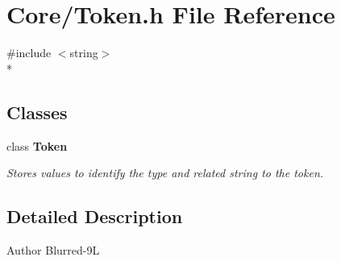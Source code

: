 \section{Core/\-Token.h File Reference}
\label{_token_8h}
{\ttfamily \#include $<$string$>$}\\*
\subsection*{Classes}
\begin{DoxyCompactItemize}
\item 
class {\bf Token}
\begin{DoxyCompactList}\small\item\em Stores values to identify the type and related string to the token. \end{DoxyCompactList}\end{DoxyCompactItemize}


\subsection{Detailed Description}
\begin{DoxyAuthor}{Author}
Blurred-\/9\-L 
\end{DoxyAuthor}
